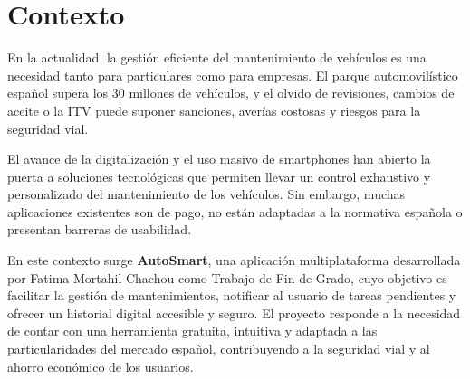\chapter{Contexto}

En la actualidad, la gestión eficiente del mantenimiento de vehículos es una necesidad tanto para particulares como para empresas. El parque automovilístico español supera los 30 millones de vehículos, y el olvido de revisiones, cambios de aceite o la ITV puede suponer sanciones, averías costosas y riesgos para la seguridad vial.

El avance de la digitalización y el uso masivo de smartphones han abierto la puerta a soluciones tecnológicas que permiten llevar un control exhaustivo y personalizado del mantenimiento de los vehículos. Sin embargo, muchas aplicaciones existentes son de pago, no están adaptadas a la normativa española o presentan barreras de usabilidad.

En este contexto surge \textbf{AutoSmart}, una aplicación multiplataforma desarrollada por Fatima Mortahil Chachou como Trabajo de Fin de Grado, cuyo objetivo es facilitar la gestión de mantenimientos, notificar al usuario de tareas pendientes y ofrecer un historial digital accesible y seguro. El proyecto responde a la necesidad de contar con una herramienta gratuita, intuitiva y adaptada a las particularidades del mercado español, contribuyendo a la seguridad vial y al ahorro económico de los usuarios. 